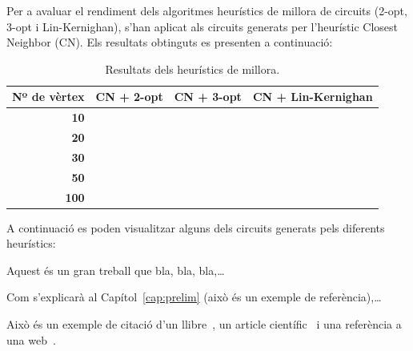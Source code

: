 \documentclass[a4paper,12pt,twoside]{ThesisStyle}
\begin{document}
\medskip

Per a avaluar el rendiment dels algoritmes heurístics de millora de circuits (2-opt, 3-opt i Lin-Kernighan), s'han aplicat als circuits generats per l'heurístic Closest Neighbor (CN). Els resultats obtinguts es presenten a continuació:

\begin{table}[htb]
  \centering
  \begin{tabular}{ | r | c | c | c | }
   \hline
   \textbf{Nº de vèrtex} & \textbf{CN + 2-opt} & \textbf{CN + 3-opt} & \textbf{CN + Lin-Kernighan} \\
   \hline
   \textbf{10}  &  &  &  \\
   \textbf{20}  &  &  &  \\
   \textbf{30}  &  &  &  \\
   \textbf{50}  &  &  &  \\
   \textbf{100} &  &  &  \\
   \hline
  \end{tabular}
  \caption{Resultats dels heurístics de millora.}
  \label{taula:heuristicsMillora}
\end{table}

\medskip

A continuació es poden visualitzar alguns dels circuits generats pels diferents heurístics:



  

















\newpage





















Aquest és un gran treball que bla, bla, bla,\ldots

Com s'explicarà al Capítol~\ref{cap:prelim} (això és un exemple de referència),\ldots

Això és un exemple de citació d'un llibre~\cite{Coleman1974}, un article científic~\cite{Ruiz2008} i una referència a una web~\cite{Halcon}.
\end{document}
